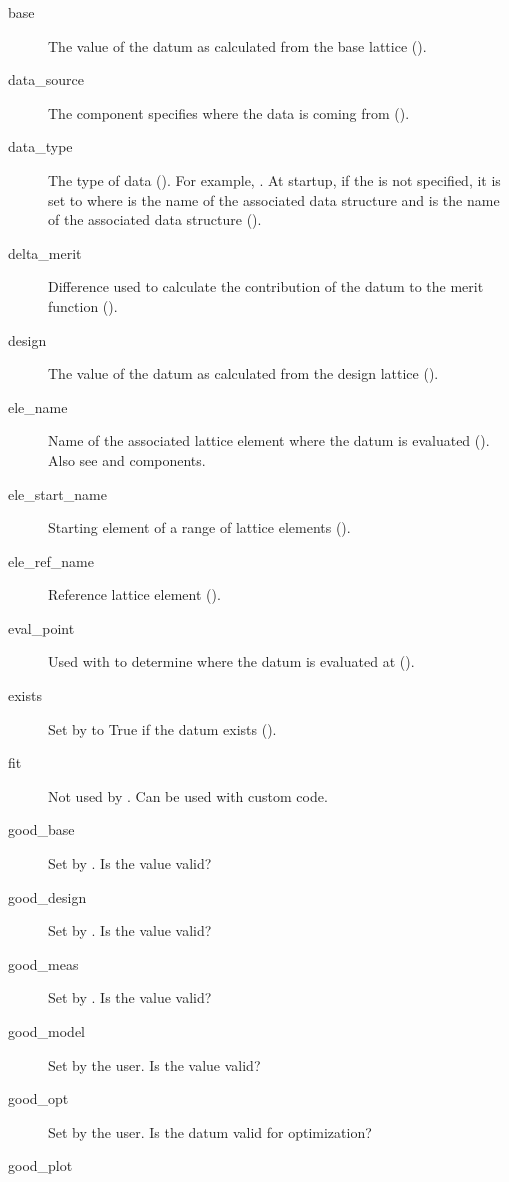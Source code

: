 \begin{description}
  \item[base] \Newline
The value of the datum as calculated from the base lattice ().
  \item[data_source] \Newline
The  component specifies where the data is coming from
().
  \item[data_type] \Newline
The type of data (). For example, . At startup, if the
 is not specified, it is set to  where
 is the name of the associated  data structure and  is 
the name of the associated  data structure ().
  \item[delta_merit] \Newline
Difference used to calculate the contribution of the datum to the merit function ().
  \item[design] \Newline
The value of the datum as calculated from the design lattice ().
  \item[ele_name] \Newline
Name of the associated lattice element where the datum is evaluated
(). Also see  and  components.
  \item[ele_start_name] \Newline
Starting element of a range of lattice elements ().
  \item[ele_ref_name] \Newline
Reference lattice element ().
  \item[eval_point] \Newline
Used with  to determine where the datum is evaluated at ().
  \item[exists] \Newline
Set by \tao to True if the datum exists (). 
  \item[fit] \Newline
Not used by \tao. Can be used with custom code.
  \item[good_base] \Newline
Set by \tao. Is the  value valid?
  \item[good_design] \Newline
Set by \tao. Is the  value valid?
  \item[good_meas] \Newline
Set by \tao. Is the  value valid?
  \item[good_model] \Newline
Set by the user. Is the  value valid?
  \item[good_opt] \Newline
Set by the user. Is the datum valid for optimization?
  \item[good_plot] \Newline

\end{description}
